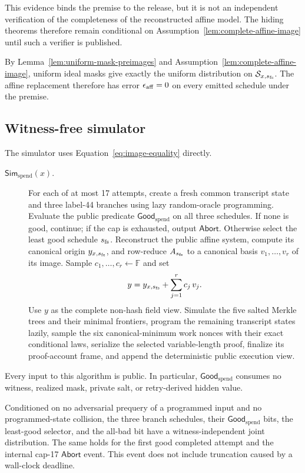This evidence binds the premise to the release, but it is not an independent
verification of the completeness of the reconstructed affine model.  The
hiding theorems therefore remain conditional on
Assumption~\ref{lem:complete-affine-image} until such a verifier is published.

By Lemma~\ref{lem:uniform-mask-preimages} and
Assumption~\ref{lem:complete-affine-image}, uniform ideal masks give exactly the
uniform distribution on \(\mathcal S_{x,s_{\rm fs}}\).  The affine replacement
therefore has error \(\epsilon_{\rm aff}=0\) on every emitted schedule under
the premise.

\subsection{Witness-free simulator}

The simulator uses Equation~\eqref{eq:image-equality} directly.

\begin{description}
\item[\(\mathsf{Sim}_{\mathrm{spend}}(x)\).]
For each of at most 17 attempts, create a fresh common transcript state and
three label-44 branches using lazy random-oracle programming.  Evaluate the
public predicate \(\mathsf{Good}_{\mathrm{spend}}\) on all three schedules.  If none is
good, continue; if the cap is exhausted, output \(\mathsf{Abort}\).  Otherwise
select the least good schedule \(s_{\rm fs}\).  Reconstruct the public affine
system, compute its canonical origin \(y_{x,s_{\rm fs}}\), and row-reduce
\(A_{s_{\rm fs}}\) to a canonical basis
\(v_1,\ldots,v_r\) of its image.  Sample
\(c_1,\ldots,c_r\leftarrow\mathbb F\) and set
\[
 y=y_{x,s_{\rm fs}}+\sum_{j=1}^r c_j\,v_j.
\]
Use \(y\) as the complete non-hash field view.  Simulate the five salted
Merkle trees and their minimal frontiers, program the remaining transcript
states lazily, sample the six canonical-minimum work nonces with their exact
conditional laws, serialize the selected variable-length proof, finalize its
proof-account frame, and append the deterministic public execution view.
\end{description}

Every input to this algorithm is public.  In particular,
\(\mathsf{Good}_{\mathrm{spend}}\) consumes no witness, realized mask, private salt, or
retry-derived hidden value.

\begin{lemma}
\label{lem:selection-hiding-abort}
Conditioned on no adversarial prequery of a programmed input and no
programmed-state collision, the three branch schedules, their
\(\mathsf{Good}_{\mathrm{spend}}\) bits,
the least-good selector, and the all-bad bit have a witness-independent joint
distribution.  The same holds for the first good completed attempt and the
internal cap-17 \(\mathsf{Abort}\) event.  This event does not include
truncation caused by a wall-clock deadline.
\end{lemma}


